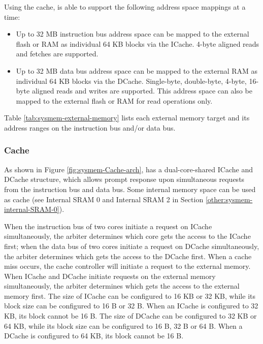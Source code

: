 \documentclass[main\_\_EN.tex]{subfiles}
\begin{document}
Using the cache, \chipname{} is able to support the following address space mappings at a time:

\begin{itemize}
    \item Up to 32 MB instruction bus address space can be mapped to the external flash or RAM as individual 64 KB blocks via the ICache. 4-byte aligned reads and fetches are supported.
    \item Up to 32 MB data bus address space can be mapped to the external RAM as individual 64 KB blocks via the DCache. Single-byte, double-byte, 4-byte, 16-byte aligned  reads and writes are supported. This address space can also be mapped to the external flash or RAM for read operations only.
\end{itemize}

Table \ref{tab:sysmem-external-memory} lists each external memory target and its address ranges on the instruction bus and/or data bus.




\subsubsection{Cache}

As shown in Figure \ref{fig:sysmem-Cache-arch}, \chipname{} has a dual-core-shared ICache and DCache structure, which allows prompt response upon simultaneous requests from the instruction bus and data bus. Some internal memory space can be used as cache (see Internal SRAM 0 and Internal SRAM 2 in Section \ref{other:sysmem-internal-SRAM-0}).

When the instruction bus of two cores initiate a request on ICache simultaneously, the arbiter determines which core gets the access to the ICache first; when the data bus of two cores initiate a request on DCache simultaneously, the arbiter determines which gets the access to the DCache first. When a cache miss occurs, the cache controller will initiate a request to the external memory. When ICache and DCache initiate requests on the external memory simultaneously, the arbiter determines which gets the access to the external memory first. The size of ICache can be configured to 16 KB or 32 KB, while its block size can be configured to 16 B or 32 B. When an ICache is configured to 32 KB, its block cannot be 16 B. The size of DCache can be configured to 32 KB or 64 KB, while its block size can be configured to 16 B, 32 B or 64 B. When a DCache is configured to 64 KB, its block cannot be 16 B.
\end{document}
